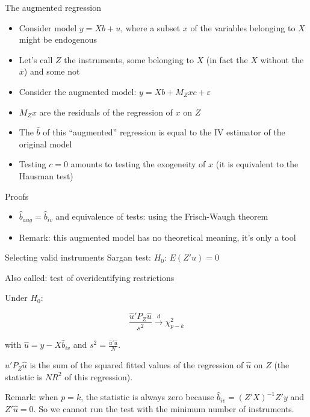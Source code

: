 \documentclass[aspectratio=169]{beamer}
\begin{document}
\begin{frame}{The augmented regression}
\begin{itemize}
    \item Consider model $y = Xb + u$, where a subset $x$ of the variables belonging to $X$ might be endogenous
    \item Let's call $Z$ the instruments, some belonging to $X$ (in fact the $X$ without the $x$) and some not
    \item Consider the augmented model: $y = Xb + M_Zxc + \varepsilon$
    \item $M_Zx$ are the residuals of the regression of $x$ on $Z$
    \item The $\hat{b}$ of this ``augmented'' regression is equal to the IV estimator of the original model
    \item Testing $c = 0$ amounts to testing the exogeneity of $x$ (it is equivalent to the Hausman test)
\end{itemize}
\end{frame}

\begin{frame}{Proofs}
\begin{itemize}
    \item $\hat{b}_{aug} = \hat{b}_{iv}$ and equivalence of tests: using the Frisch-Waugh theorem
    \item Remark: this augmented model has no theoretical meaning, it's only a tool
\end{itemize}
\end{frame}

\begin{frame}{Selecting valid instruments}
Sargan test: $H_0$: $E(Z'u) = 0$

Also called: test of overidentifying restrictions

Under $H_0$:

\[\frac{\hat{u}'P_Z\hat{u}}{s^2} \xrightarrow{d} \chi_{p-k}^2\]

with $\hat{u} = y - X\hat{b}_{iv}$ and $s^2 = \frac{\hat{u}'\hat{u}}{N}$.

$\hat{u}'P_Z\hat{u}$ is the sum of the squared fitted values of the regression of $\hat{u}$ on $Z$ (the statistic is $N R^2$ of this regression).

Remark: when $p = k$, the statistic is always zero because $\hat{b}_{iv} = (Z'X)^{-1}Z'y$ and $Z'\hat{u} = 0$. So we cannot run the test with the minimum number of instruments.
\end{frame}
\end{document}
